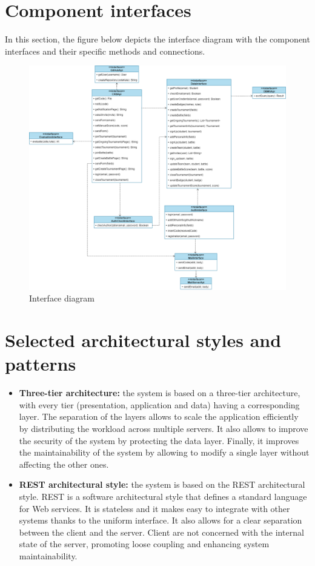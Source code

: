 \section{Component interfaces}
In this section, the figure below depicts the interface diagram with the component interfaces and their specific methods and connections.
\begin{figure}[H]
    \centering
    \includegraphics[width=1\textwidth]{images/Interface_diagram.png}
    \caption{Interface diagram}
\end{figure}
\clearpage

\section{Selected architectural styles and patterns}

\begin{itemize}
    \item \textbf{Three-tier architecture: }the system is based on a three-tier architecture, with every tier (presentation, application and data) 
    having a corresponding layer. The separation of the layers allows to scale the application efficiently by distributing the workload across 
    multiple servers. It also allows to improve the security of the system by protecting the data layer.
    Finally, it improves the maintainability of the system by allowing to modify a single layer without affecting the other ones.
    \item \textbf{REST architectural style: }the system is based on the REST architectural style. REST is a software architectural style that 
    defines a standard language for Web services. It is stateless and it makes easy to integrate with other systems thanks to the uniform 
    interface. It also allows for a clear separation between the client and the server. Client are not concerned with the internal state of the 
    server, promoting loose coupling and enhancing system maintainability.
\end{itemize}


